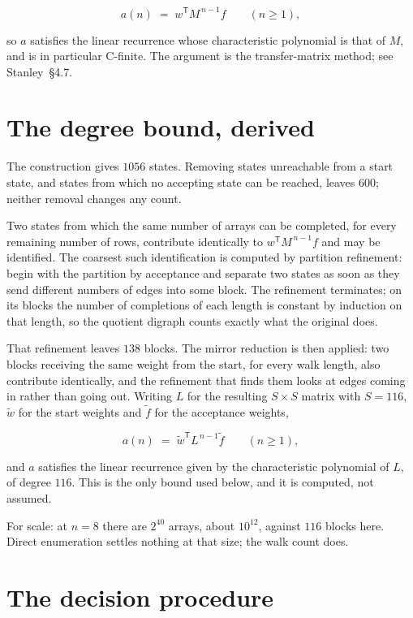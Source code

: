 \documentclass[11pt]{article}
\theoremstyle{definition}
\begin{document}
\[a(n) \;=\; w^{\mathsf T} M^{\,n-1} f \qquad (n \ge 1),\]

so $a$ satisfies the linear recurrence whose characteristic polynomial is that of $M$, and is in particular C-finite. The argument is the transfer-matrix method; see Stanley~\S4.7.

\section{The degree bound, derived}

The construction gives $1056$ states. Removing states unreachable from a start state, and states from which no accepting state can be reached, leaves $600$; neither removal changes any count.

Two states from which the same number of arrays can be completed, for every remaining number of rows, contribute identically to $w^{\mathsf T}M^{\,n-1}f$ and may be identified. The coarsest such identification is computed by partition refinement: begin with the partition by acceptance and separate two states as soon as they send different numbers of edges into some block. The refinement terminates; on its blocks the number of completions of each length is constant by induction on that length, so the quotient digraph counts exactly what the original does.

That refinement leaves $138$ blocks. The mirror reduction is then applied: two blocks receiving the same weight from the start, for every walk length, also contribute identically, and the refinement that finds them looks at edges coming in rather than going out. Writing $L$ for the resulting $S \times S$ matrix with $S = 116$, $\tilde w$ for the start weights and $\tilde f$ for the acceptance weights,

\[a(n) \;=\; \tilde w^{\mathsf T} L^{\,n-1} \tilde f \qquad (n \ge 1),\]

and $a$ satisfies the linear recurrence given by the characteristic polynomial of $L$, of degree $116$. This is the only bound used below, and it is computed, not assumed.

For scale: at $n = 8$ there are $2^{40}$ arrays, about $10^{12}$, against $116$ blocks here. Direct enumeration settles nothing at that size; the walk count does.

\section{The decision procedure}
\end{document}
